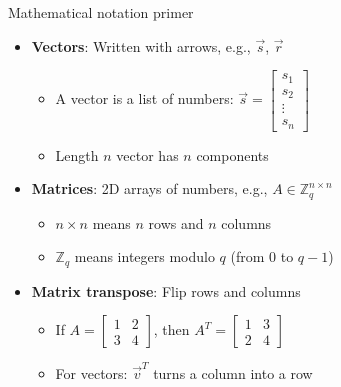\documentclass[aspectratio=169, lualatex, handout]{beamer}
\begin{document}
\begin{frame}{Mathematical notation primer}
	\begin{itemize}
		\item \textbf{Vectors}: Written with arrows, e.g., $\vec{s}$, $\vec{r}$
		      \begin{itemize}
			      \item A vector is a list of numbers: $\vec{s} = \begin{bmatrix} s_1 \\ s_2 \\ \vdots \\ s_n \end{bmatrix}$
			      \item Length $n$ vector has $n$ components
		      \end{itemize}
		\item \textbf{Matrices}: 2D arrays of numbers, e.g., $A \in \mathbb{Z}_q^{n \times n}$
		      \begin{itemize}
			      \item $n \times n$ means $n$ rows and $n$ columns
			      \item $\mathbb{Z}_q$ means integers modulo $q$ (from 0 to $q-1$)
		      \end{itemize}
		\item \textbf{Matrix transpose}: Flip rows and columns
		      \begin{itemize}
			      \item If $A = \begin{bmatrix} 1 & 2 \\ 3 & 4 \end{bmatrix}$, then $A^T = \begin{bmatrix} 1 & 3 \\ 2 & 4 \end{bmatrix}$
			      \item For vectors: $\vec{v}^T$ turns a column into a row
		      \end{itemize}
	\end{itemize}
\end{frame}
\end{document}
